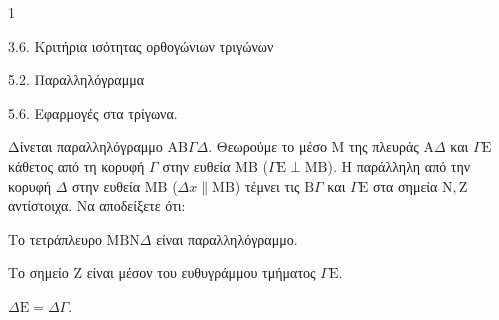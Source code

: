 \begin{ylh}{1}
    \item 3.6. Κριτήρια ισότητας ορθογώνιων τριγώνων
    \item 5.2. Παραλληλόγραμμα
    \item 5.6. Εφαρμογές στα τρίγωνα.
\end{ylh}
Δίνεται παραλληλόγραμμο $\mathrm{A}\mathrm{B}\Gamma\Delta$. Θεωρούμε το μέσο $\mathrm{M}$ της πλευράς $\mathrm{A}\Delta$ και $\Gamma\mathrm{E}$ κάθετος από τη κορυφή $\Gamma$ στην ευθεία $\mathrm{M}\mathrm{B}$ ($\Gamma\mathrm{E} \perp \mathrm{M}\mathrm{B}$). Η παράλληλη από την κορυφή $\Delta$ στην ευθεία $\mathrm{M}\mathrm{B}$ ($\Delta x \parallel \mathrm{M}\mathrm{B}$) τέμνει τις $\mathrm{B}\Gamma$ και $\Gamma\mathrm{E}$ στα σημεία $\mathrm{N}, \mathrm{Z}$ αντίστοιχα.
Να αποδείξετε ότι:
\begin{alist}
    \item Το τετράπλευρο $\mathrm{M}\mathrm{B}\mathrm{N}\Delta$ είναι παραλληλόγραμμο. 
    \item Το σημείο $\mathrm{Z}$ είναι μέσον του ευθυγράμμου τμήματος $\Gamma\mathrm{E}$. 
    \item $\Delta\mathrm{E} = \Delta\Gamma$. 
\end{alist}
